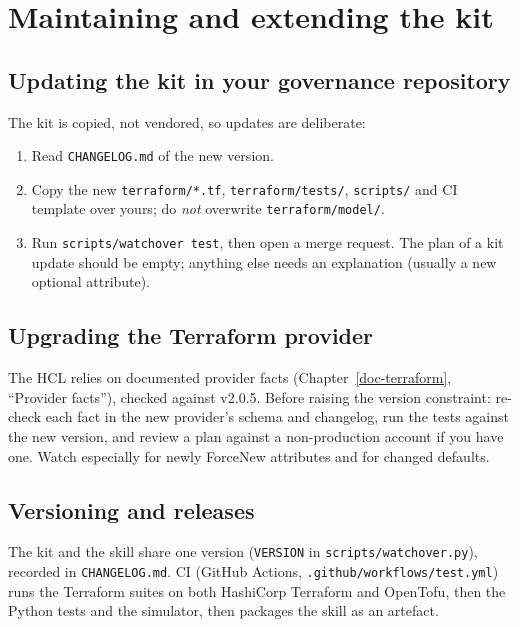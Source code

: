 \chapter{Maintaining and extending the kit}\label{ch:maintenance}

\section{Updating the kit in your governance repository}
The kit is copied, not vendored, so updates are deliberate:
\begin{enumerate}
\item Read \texttt{CHANGELOG.md} of the new version.
\item Copy the new \texttt{terraform/*.tf}, \texttt{terraform/tests/}, \texttt{scripts/} and CI
  template over yours; do \emph{not} overwrite \texttt{terraform/model/}.
\item Run \texttt{scripts/watchover test}, then open a merge request. The plan of a kit update
  should be empty; anything else needs an explanation (usually a new optional attribute).
\end{enumerate}

\section{Upgrading the Terraform provider}
The HCL relies on documented provider facts (Chapter~\ref{doc-terraform}, ``Provider facts''),
checked against v2.0.5. Before raising the version constraint:
re-check each fact in the new provider's schema and changelog, run the tests against the new
version, and review a plan against a non-production account if you have one. Watch especially for
newly ForceNew attributes and for changed defaults.

\section{Versioning and releases}
The kit and the skill share one version (\texttt{VERSION} in \texttt{scripts/watchover.py}),
recorded in \texttt{CHANGELOG.md}. CI (GitHub Actions, \texttt{.github/workflows/test.yml}) runs
the Terraform suites on both HashiCorp Terraform and OpenTofu, then the Python tests and the
simulator, then packages the skill as an artefact.

